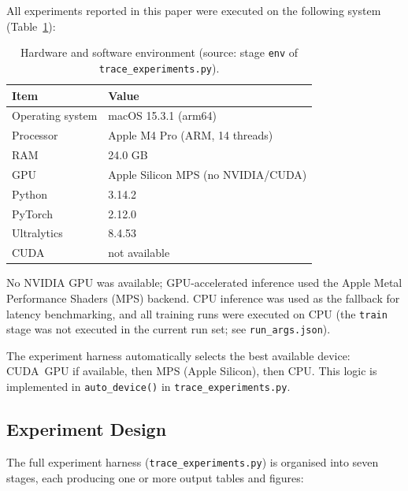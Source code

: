 All experiments reported in this paper were executed on the following
system (Table~\ref{tab:env}):

\begin{table}[htbp]
\centering
\caption{Hardware and software environment (source: stage \texttt{env}
  of \texttt{trace\_experiments.py}).}
\label{tab:env}
\begin{tabular}{ll}
\toprule
Item & Value \\
\midrule
Operating system  & macOS 15.3.1 (arm64) \\
Processor         & Apple M4 Pro (ARM, 14 threads) \\
RAM               & 24.0 GB \\
GPU               & Apple Silicon MPS (no NVIDIA/CUDA) \\
Python            & 3.14.2 \\
PyTorch           & 2.12.0 \\
Ultralytics       & 8.4.53 \\
CUDA              & not available \\
\bottomrule
\end{tabular}
\end{table}

No NVIDIA GPU was available; GPU-accelerated inference used the Apple
Metal Performance Shaders (MPS) backend.
CPU inference was used as the fallback for latency benchmarking, and all
training runs were executed on CPU (the \texttt{train} stage was not
executed in the current run set; see \texttt{run\_args.json}).

The experiment harness automatically selects the best available device:
CUDA~GPU if available, then MPS (Apple Silicon), then CPU.
This logic is implemented in \texttt{auto\_device()} in
\texttt{trace\_experiments.py}.

\subsection{Experiment Design}
\label{sec:exp-design}

The full experiment harness (\texttt{trace\_experiments.py}) is organised
into seven stages, each producing one or more output tables and figures:

